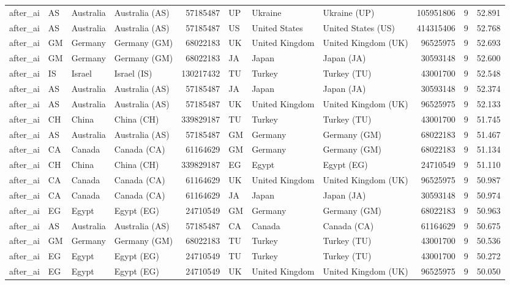\begin{tabular}{llllrlllrrr}
after\_ai & AS & Australia & Australia (AS) & 57185487 & UP & Ukraine & Ukraine (UP) & 105951806 & 9 & 52.891 \\
after\_ai & AS & Australia & Australia (AS) & 57185487 & US & United States & United States (US) & 414315406 & 9 & 52.768 \\
after\_ai & GM & Germany & Germany (GM) & 68022183 & UK & United Kingdom & United Kingdom (UK) & 96525975 & 9 & 52.693 \\
after\_ai & GM & Germany & Germany (GM) & 68022183 & JA & Japan & Japan (JA) & 30593148 & 9 & 52.600 \\
after\_ai & IS & Israel & Israel (IS) & 130217432 & TU & Turkey & Turkey (TU) & 43001700 & 9 & 52.548 \\
after\_ai & AS & Australia & Australia (AS) & 57185487 & JA & Japan & Japan (JA) & 30593148 & 9 & 52.374 \\
after\_ai & AS & Australia & Australia (AS) & 57185487 & UK & United Kingdom & United Kingdom (UK) & 96525975 & 9 & 52.133 \\
after\_ai & CH & China & China (CH) & 339829187 & TU & Turkey & Turkey (TU) & 43001700 & 9 & 51.745 \\
after\_ai & AS & Australia & Australia (AS) & 57185487 & GM & Germany & Germany (GM) & 68022183 & 9 & 51.467 \\
after\_ai & CA & Canada & Canada (CA) & 61164629 & GM & Germany & Germany (GM) & 68022183 & 9 & 51.134 \\
after\_ai & CH & China & China (CH) & 339829187 & EG & Egypt & Egypt (EG) & 24710549 & 9 & 51.110 \\
after\_ai & CA & Canada & Canada (CA) & 61164629 & UK & United Kingdom & United Kingdom (UK) & 96525975 & 9 & 50.987 \\
after\_ai & CA & Canada & Canada (CA) & 61164629 & JA & Japan & Japan (JA) & 30593148 & 9 & 50.974 \\
after\_ai & EG & Egypt & Egypt (EG) & 24710549 & GM & Germany & Germany (GM) & 68022183 & 9 & 50.963 \\
after\_ai & AS & Australia & Australia (AS) & 57185487 & CA & Canada & Canada (CA) & 61164629 & 9 & 50.675 \\
after\_ai & GM & Germany & Germany (GM) & 68022183 & TU & Turkey & Turkey (TU) & 43001700 & 9 & 50.536 \\
after\_ai & EG & Egypt & Egypt (EG) & 24710549 & TU & Turkey & Turkey (TU) & 43001700 & 9 & 50.272 \\
after\_ai & EG & Egypt & Egypt (EG) & 24710549 & UK & United Kingdom & United Kingdom (UK) & 96525975 & 9 & 50.050 \\

\end{tabular}
